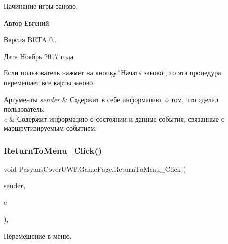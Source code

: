 Начинание игры заново. 

\begin{DoxyAuthor}{Автор}
Евгений 
\end{DoxyAuthor}
\begin{DoxyVersion}{Версия}
B\+E\+TA 0.. 
\end{DoxyVersion}
\begin{DoxyDate}{Дата}
Ноябрь 2017 года
\end{DoxyDate}
Если пользователь нажмет на кнопку \char`\"{}Начать заново\char`\"{}, то эта процедура перемешает все карты заново. 
\begin{DoxyParams}{Аргументы}
{\em sender} & Содержит в себе информацию, о том, что сделал пользователь. \\
\hline
{\em e} & Содержит информацию о состоянии и данные события, связанные с маршрутизируемым событием. \\
\hline
\end{DoxyParams}
\mbox{\label{class_pasyans_cover_u_w_p_1_1_game_page_a90a511fcd533f56ae276b2eab9751e20}} 
\subsubsection{\texorpdfstring{Return\+To\+Menu\+\_\+\+Click()}{ReturnToMenu\_Click()}}
{\footnotesize\ttfamily void Pasyans\+Cover\+U\+W\+P.\+Game\+Page.\+Return\+To\+Menu\+\_\+\+Click (\begin{DoxyParamCaption}\item[{object}]{sender,  }\item[{Routed\+Event\+Args}]{e }\end{DoxyParamCaption})\hspace{0.3cm}{\ttfamily [inline]}, {\ttfamily [private]}}



Перемещение в меню. 

